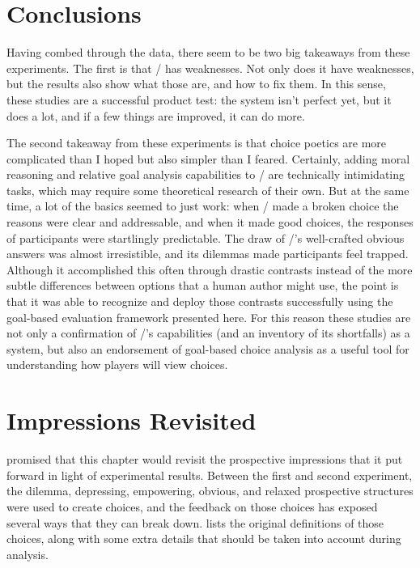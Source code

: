 \section{Conclusions}


Having combed through the data, there seem to be two big takeaways from these experiments.
%
The first is that \dunyazad/ has weaknesses.
%
Not only does it have weaknesses, but the results also show what those are, and how to fix them.
%
In this sense, these studies are a successful product test: the system isn't perfect yet, but it does a lot, and if a few things are improved, it can do more.


The second takeaway from these experiments is that choice poetics are more complicated than I hoped but also simpler than I feared.
%
Certainly, adding moral reasoning and relative goal analysis capabilities to \dunyazad/ are technically intimidating tasks, which may require some theoretical research of their own.
%
But at the same time, a lot of the basics seemed to just work: when \dunyazad/ made a broken choice the reasons were clear and addressable, and when it made good choices, the responses of participants were startlingly predictable.
%
The draw of \dunyazad/'s well-crafted obvious answers was almost irresistible, and its dilemmas made participants feel trapped.
%
Although it accomplished this often through drastic contrasts instead of the more subtle differences between options that a human author might use, the point is that it was able to recognize and deploy those contrasts successfully using the goal-based evaluation framework presented here.
%
For this reason these studies are not only a confirmation of \dunyazad/'s capabilities (and an inventory of its shortfalls) as a system, but also an endorsement of goal-based choice analysis as a useful tool for understanding how players will view choices.

\section{Impressions Revisited}

\label{sec:results-prospective-caveats}
\label{sec:results-retrospective-caveats}

 promised that this chapter would revisit the prospective impressions that it put forward in light of experimental results.
%
Between the first and second experiment, the dilemma, depressing, empowering, obvious, and relaxed prospective structures were used to create choices, and the feedback on those choices has exposed several ways that they can break down.
%
 lists the original definitions of those choices, along with some extra details that should be taken into account during analysis.


